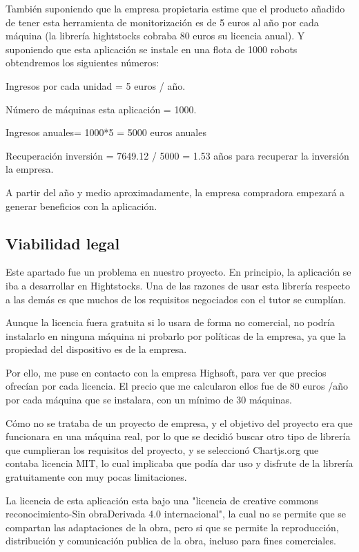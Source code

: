 También suponiendo que la empresa propietaria estime que el producto añadido de tener esta herramienta de monitorización es de 5 euros al año por cada máquina (la librería hightstocks cobraba 80 euros su licencia anual).
Y suponiendo que esta aplicación se instale en una flota de 1000 robots obtendremos los siguientes números:

Ingresos por cada unidad = 5 euros / año.

Número de máquinas esta aplicación = 1000.

Ingresos anuales= 1000*5 = 5000 euros anuales

Recuperación inversión = 7649.12 /  5000 = 1.53 años para recuperar la inversión la empresa. 

A partir del año y medio aproximadamente, la empresa compradora empezará a generar beneficios con la aplicación.

\subsection{Viabilidad legal}
Este apartado fue un problema en nuestro proyecto. En principio, la aplicación se iba a desarrollar en Hightstocks. Una de las razones de usar esta librería respecto a las demás es que muchos de los requisitos negociados con el tutor se cumplían.



Aunque la licencia fuera gratuita si lo usara de forma no comercial, no podría instalarlo en ninguna máquina ni probarlo por políticas de la empresa, ya que la propiedad del dispositivo es de la empresa. 

Por ello, me puse en contacto con la empresa Highsoft, para ver que precios ofrecían por cada licencia. El precio que me calcularon ellos fue de 80 euros /año por cada máquina que se instalara, con un mínimo de 30 máquinas. 

Cómo no se trataba de un proyecto de empresa, y el objetivo del proyecto era que funcionara en una máquina real, por lo que se decidió buscar otro tipo de librería que cumplieran los requisitos del proyecto, y se seleccionó Chartjs.org que contaba licencia MIT, lo cual implicaba que podía dar uso y disfrute de la librería gratuitamente con muy pocas limitaciones.

La licencia de esta aplicación esta bajo una "licencia de creative commons reconocimiento-Sin obraDerivada 4.0 internacional", la cual no se permite que se compartan las adaptaciones de la obra, pero si que se permite la reproducción, distribución y comunicación publica de la obra, incluso para fines comerciales.